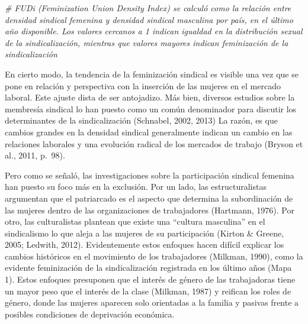 \documentclass[
]{book}
\newenvironment{Shaded}{\begin{snugshade}}{\end{snugshade}}
\newcommand{\CommentTok}[1]{\textcolor[rgb]{0.56,0.35,0.01}{\textit{#1}}}
\begin{document}
\begin{Shaded}
\begin{Highlighting}[]
\CommentTok{# FUDi (Feminization Union Density Index) se calculó como la relación entre densidad sindical femenina y densidad sindical masculina por país, en el último año disponible. Los valores cercanos a 1 indican igualdad en la distribución sexual de la sindicalización, mientras que valores mayores indican feminización de la sindicalización}
\end{Highlighting}
\end{Shaded}

En cierto modo, la tendencia de la feminización sindical es visible una vez que se pone en relación y perspectiva con la inserción de las mujeres en el mercado laboral. Este ajuste dista de ser antojadizo. Más bien, diversos estudios sobre la membresía sindical lo han puesto como un común denominador para discutir los determinantes de la sindicalización (Schnabel, 2002, 2013) La razón, es que cambios grandes en la densidad sindical generalmente indican un cambio en las relaciones laborales y una evolución radical de los mercados de trabajo (Bryson et al., 2011, p.~98).

Pero como se señaló, las investigaciones sobre la participación sindical femenina han puesto su foco más en la exclusión. Por un lado, las estructuralistas argumentan que el patriarcado es el aspecto que determina la subordinación de las mujeres dentro de las organizaciones de trabajadores (Hartmann, 1976). Por otro, las culturalistas plantean que existe una ``cultura masculina'' en el sindicalismo lo que aleja a las mujeres de su participación (Kirton \& Greene, 2005; Ledwith, 2012). Evidentemente estos enfoques hacen difícil explicar los cambios históricos en el movimiento de los trabajadores (Milkman, 1990), como la evidente feminización de la sindicalización registrada en los último años (Mapa 1). Estos enfoques presuponen que el interés de género de las trabajadoras tiene un mayor peso que el interés de la clase (Milkman, 1987) y reifican los roles de género, donde las mujeres aparecen solo orientadas a la familia y pasivas frente a posibles condiciones de deprivación económica.
\end{document}

